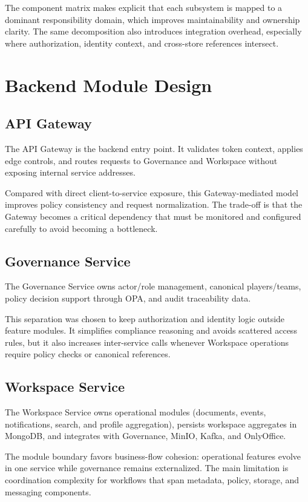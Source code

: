 The component matrix makes explicit that each subsystem is mapped to a dominant
responsibility domain, which improves maintainability and ownership clarity.
The same decomposition also introduces integration overhead, especially where
authorization, identity context, and cross-store references intersect.

\section{Backend Module Design}

\subsection{API Gateway}

The API Gateway is the backend entry point. It validates token context, applies
edge controls, and routes requests to Governance and Workspace without exposing
internal service addresses.

Compared with direct client-to-service exposure, this Gateway-mediated model
improves policy consistency and request normalization. The trade-off is that
the Gateway becomes a critical dependency that must be monitored and configured
carefully to avoid becoming a bottleneck.

\subsection{Governance Service}

The Governance Service owns actor/role management, canonical players/teams,
policy decision support through OPA, and audit traceability data.

This separation was chosen to keep authorization and identity logic outside
feature modules. It simplifies compliance reasoning and avoids scattered access
rules, but it also increases inter-service calls whenever Workspace operations
require policy checks or canonical references.

\subsection{Workspace Service}

The Workspace Service owns operational modules (documents, events,
notifications, search, and profile aggregation), persists workspace aggregates
in MongoDB, and integrates with Governance, MinIO, Kafka, and OnlyOffice.

The module boundary favors business-flow cohesion: operational features evolve
in one service while governance remains externalized. The main limitation is
coordination complexity for workflows that span metadata, policy, storage, and
messaging components.

